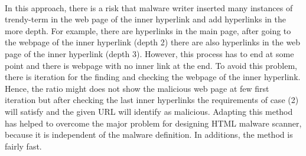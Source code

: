 \paragraph{} 
In this approach, there is a risk that malware writer inserted many instances of trendy-term in the web page of the inner hyperlink and add hyperlinks in the more depth. For example, there are hyperlinks in the main page, after going to the webpage of the inner hyperlink (depth 2) there are also hyperlinks in the web page of the inner hyperlink (depth 3). However, this process has to end at some point and there is webpage with no inner link at the end. To avoid this problem, there is iteration for the finding and checking the webpage of the inner hyperlink. Hence, the ratio might does not show the malicious web page at few first iteration but after checking the last inner hyperlinks the requirements of case (2) will satisfy and the given URL will identify as malicious. Adapting this method has helped to overcome the major problem for designing HTML malware scanner, because it is independent of the malware definition. In additions, the method is fairly fast.  
